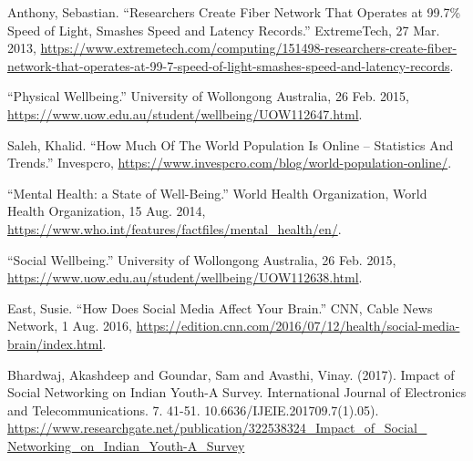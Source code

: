 \documentclass[a4paper, 11pt]{article}
\begin{document}
\begin{thebibliography}{X}

  Anthony, Sebastian. “Researchers Create Fiber Network That Operates at 99.7\% Speed of Light, Smashes Speed and Latency Records.” ExtremeTech, 27 Mar. 2013, \href{https://www.extremetech.com/computing/151498-researchers-create-fiber-network-that-operates-at-99-7-speed-of-light-smashes-speed-and-latency-records}{https://www.extremetech.com/computing/151498-researchers-create-fiber-network-that-operates-at-99-7-speed-of-light-smashes-speed-and-latency-records}.

  “Physical Wellbeing.” University of Wollongong Australia, 26 Feb. 2015, \href{https://www.uow.edu.au/student/wellbeing/UOW112647.html}{https://www.uow.edu.au/student/wellbeing/UOW112647.html}.

  Saleh, Khalid. “How Much Of The World Population Is Online – Statistics And Trends.” Invespcro, \href{https://www.invespcro.com/blog/world-population-online/}{https://www.invespcro.com/blog/world-population-online/}.

  “Mental Health: a State of Well-Being.” World Health Organization, World Health Organization, 15 Aug. 2014, \href{https://www.who.int/features/factfiles/mental\_health/en/}{https://www.who.int/features/factfiles/mental\_health/en/}.

  “Social Wellbeing.” University of Wollongong Australia, 26 Feb. 2015, \href{https://www.uow.edu.au/student/wellbeing/UOW112638.html}{https://www.uow.edu.au/student/wellbeing/UOW112638.html}.

  East, Susie. “How Does Social Media Affect Your Brain.” CNN, Cable News Network, 1 Aug. 2016, \href{https://edition.cnn.com/2016/07/12/health/social-media-brain/index.html}{https://edition.cnn.com/2016/07/12/health/social-media-brain/index.html}.

  Bhardwaj, Akashdeep and Goundar, Sam and Avasthi, Vinay. (2017). Impact of Social Networking on Indian Youth-A Survey. International Journal of Electronics and Telecommunications. 7. 41-51. 10.6636/IJEIE.201709.7(1).05). \href{https://www.researchgate.net/publication/322538324\_Impact\_of\_Social\_Networking\_on\_Indian\_Youth-A\_Survey}{https://www.researchgate.net/publication/322538324\_Impact\_of\_Social\_\\Networking\_on\_Indian\_Youth-A\_Survey}


\end{thebibliography}
\end{document}
